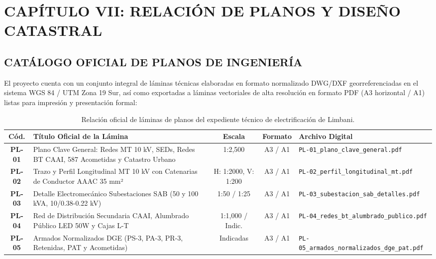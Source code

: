 \chapter*{CAPÍTULO VII: RELACIÓN DE PLANOS Y DISEÑO CATASTRAL}

\section{CATÁLOGO OFICIAL DE PLANOS DE INGENIERÍA}

El proyecto cuenta con un conjunto integral de láminas técnicas elaboradas en formato normalizado DWG/DXF georreferenciadas en el sistema WGS 84 / UTM Zona 19 Sur, así como exportadas a láminas vectoriales de alta resolución en formato PDF (A3 horizontal / A1) listas para impresión y presentación formal:

\begin{table}[H]
\centering
\small
\begin{tabular}{|c|p{7.2cm}|c|c|p{4.2cm}|}
\hline
\textbf{Cód.} & \textbf{Título Oficial de la Lámina} & \textbf{Escala} & \textbf{Formato} & \textbf{Archivo Digital} \\
\hline
\textbf{PL-01} & Plano Clave General: Redes MT 10 kV, SEDs, Redes BT CAAI, 587 Acometidas y Catastro Urbano & 1:2,500 & A3 / A1 & \texttt{PL-01\_plano\_clave\_general.pdf} \\
\textbf{PL-02} & Trazo y Perfil Longitudinal MT 10 kV con Catenarias de Conductor AAAC 35 mm² & H: 1:2000, V: 1:200 & A3 / A1 & \texttt{PL-02\_perfil\_longitudinal\_mt.pdf} \\
\textbf{PL-03} & Detalle Electromecánico Subestaciones SAB (50 y 100 kVA, 10/0.38-0.22 kV) & 1:50 / 1:25 & A3 / A1 & \texttt{PL-03\_subestacion\_sab\_detalles.pdf} \\
\textbf{PL-04} & Red de Distribución Secundaria CAAI, Alumbrado Público LED 50W y Cajas L-T & 1:1,000 / Indic. & A3 / A1 & \texttt{PL-04\_redes\_bt\_alumbrado\_publico.pdf} \\
\textbf{PL-05} & Armados Normalizados DGE (PS-3, PA-3, PR-3, Retenidas, PAT y Acometidas) & Indicadas & A3 / A1 & \texttt{PL-05\_armados\_normalizados\_dge\_pat.pdf} \\
\hline
\end{tabular}
\caption{Relación oficial de láminas de planos del expediente técnico de electrificación de Limbani.}
\label{tab:relacion_planos}
\end{table}

